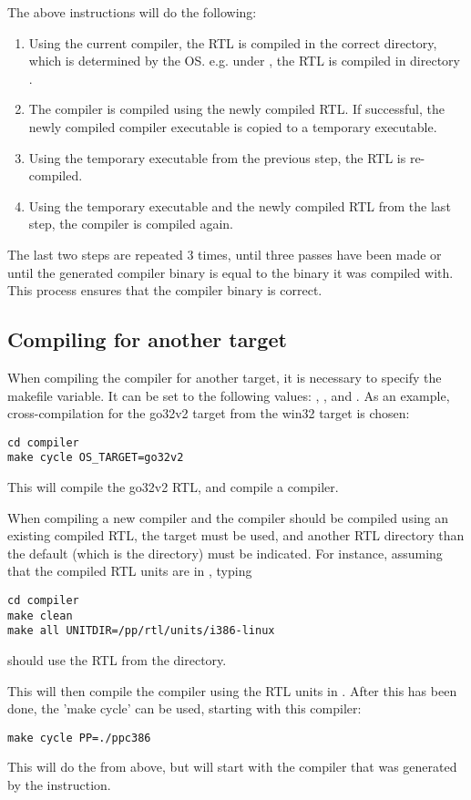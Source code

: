 The above instructions will do the following:
\begin{enumerate}
\item Using the current compiler, the RTL is compiled in the correct
directory, which is determined by the OS. e.g. under \linux,
the RTL is compiled in directory .
\item The compiler is compiled using the newly compiled RTL. If successful,
the newly compiled compiler executable is copied to a temporary executable.
\item Using the temporary executable from the previous step, the RTL is
re-compiled.
\item Using the temporary executable and the newly compiled RTL from the
last step, the compiler is compiled again.
\end{enumerate}
The last two steps are repeated 3 times, until three passes have been made or
until the generated compiler binary is equal to the binary it was compiled
with. This process ensures that the compiler binary is correct.

\subsection{Compiling for another target}
When compiling the compiler for another target, it is necessary to specify
the  makefile variable. It can be set to the following
values: , ,  and .
As an example, cross-compilation for the go32v2 target from the win32 target
is chosen:
\begin{verbatim}
cd compiler
make cycle OS_TARGET=go32v2
\end{verbatim}
This will compile the go32v2 RTL, and compile a  compiler.

When compiling a new compiler and the compiler should be compiled using an 
existing compiled RTL, the  target must be used, and another RTL 
directory than the default (which is the  
directory) must be indicated. For instance, assuming that the compiled RTL 
units are in , typing
\begin{verbatim}
cd compiler
make clean
make all UNITDIR=/pp/rtl/units/i386-linux
\end{verbatim}
should use the RTL from the  directory.

This will then compile the compiler using the RTL units in
.
After this has been done, the 'make cycle' can be used, starting with this
compiler:
\begin{verbatim}
make cycle PP=./ppc386
\end{verbatim}
This will do the  from above, but will start with the compiler
that was generated by the  instruction.

